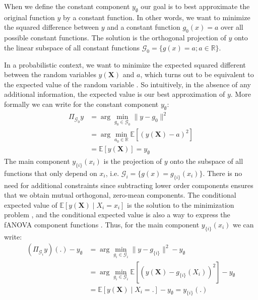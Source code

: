 When we define the constant component $y_\emptyset$ our goal is to best approximate the original function $y$ by a constant function. In other words, we want to minimize the squared difference between $y$ and a constant function $g_0(x) = a$ over all possible constant functions. The solution is the orthogonal projection of $y$ onto the linear subspace of all constant functions $\mathcal{G}_0 = \{g(x) = a; a \in \mathbb{R}\}$.\par
In a probabilistic context, we want to minimize the expected squared different between the random variables $y(\boldsymbol{X})$ and $a$, which turns out to be equivalent to the expected value of the random variable \citep{Vaart_1998}. So intuitively, in the absence of any additional information, the expected value is our best approximation of $y$. More formally we can write for the constant component $y_{\emptyset}$:
\begin{align*}
    \Pi_{\mathcal{G}_0}y
    &= \arg \min_{g_0 \in \mathcal{G}_0} \|y - g_0\|^2 \\ %
    &= \arg \min_{a_0 \in \mathbb{R}} \mathbb{E}[(y(\boldsymbol{X}) - a)^2] \\ %
    &= \mathbb{E}[y(\boldsymbol{X})] = y_{\emptyset}
\end{align*}
The main component $y_{\{i\}}(x_i)$ is the projection of $y$ onto the subspace of all functions that only depend on $x_i$, i.e. $\mathcal{G}_i = \{g(x) = g_{\{i\}}(x_i)\}$. There is no need for additional constraints since subtracting lower order components ensures that we obtain mutual orthogonal, zero-mean components.
The conditional expected value of $\mathbb{E}[y(\boldsymbol{X}) \mid X_i = x_i]$ is the solution to the minimization problem \citep{Vaart_1998}, and the conditional expected value is also a way to express the fANOVA component functions \citep{muehlenstaedt2012}. Thus, for the main component $y_{\{i\}}(x_i)$  we can write:
\begin{align*}
    (\Pi_{\mathcal{G}_i}y)(.) - y_{\emptyset}
    &= \arg \min_{g_i \in \mathcal{G}_i} \|y - g_{\{i\}}\|^2 - y_{\emptyset}\\
    &= \arg \min_{g_i \in \mathcal{G}_i} \mathbb{E}[(y(\boldsymbol{X}) - g_{\{i\}}(X_i))^2] - y_{\emptyset} \\
    &= \mathbb{E}[y(\boldsymbol{X}) \mid X_i = .] - y_{\emptyset} = y_{\{i\}}(.)
\end{align*}

